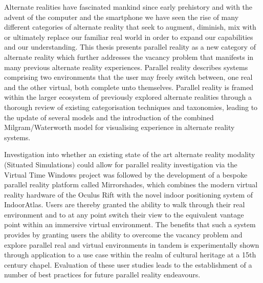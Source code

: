 Alternate realities have fascinated mankind since early prehistory and with the advent of the computer and the smartphone we have seen the rise of many different categories of alternate reality that seek to augment, diminish, mix with or ultimately replace our familiar real world in order to expand our capabilities and our understanding. This thesis presents parallel reality as a new category of alternate reality which further addresses the vacancy problem that manifests in many previous alternate reality experiences. Parallel reality describes systems comprising two environments that the user may freely switch between, one real and the other virtual, both complete unto themselves. Parallel reality is framed within the larger ecosystem of previously explored alternate realities through a thorough review of existing categorisation techniques and taxonomies, leading to the update of several models and the introduction of the combined Milgram/Waterworth model for visualising experience in alternate reality systems.

Investigation into whether an existing state of the art alternate reality modality (Situated Simulations) could allow for parallel reality investigation via the Virtual Time Windows project was followed by the development of a bespoke parallel reality platform called Mirrorshades, which combines the modern virtual reality hardware of the Oculus Rift with the novel indoor positioning system of IndoorAtlas. Users are thereby granted the ability to walk through their real environment and to at any point switch their view to the equivalent vantage point within an immersive virtual environment. The benefits that such a system provides by granting users the ability to overcome the vacancy problem and explore parallel real and virtual environments in tandem is experimentally shown through application to a use case within the realm of cultural heritage at a 15th century chapel. Evaluation of these user studies leads to the establishment of a number of best practices for future parallel reality endeavours.